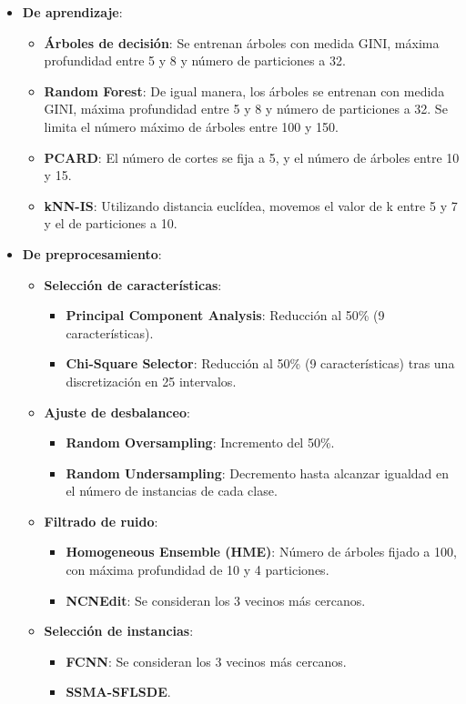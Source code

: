 \begin{itemize}
    \item \textbf{De aprendizaje}: \begin{itemize}
        \item \textbf{Árboles de decisión}: Se entrenan árboles con medida GINI, máxima profundidad entre 5 y 8 y número de particiones a 32.
        \item \textbf{Random Forest}: De igual manera, los árboles se entrenan con medida GINI, máxima profundidad entre 5 y 8 y número de particiones a 32. Se limita el número máximo de árboles entre 100 y 150.
        \item \textbf{PCARD}: El número de cortes se fija a 5, y el número de árboles entre 10 y 15.
        \item \textbf{kNN-IS}: Utilizando distancia euclídea, movemos el valor de k entre 5 y 7 y el de particiones a 10.
    \end{itemize}
    \item \textbf{De preprocesamiento}: \begin{itemize}
        \item \textbf{Selección de características}: \begin{itemize}
            \item \textbf{Principal Component Analysis}: Reducción al 50\% (9 características).
            \item \textbf{Chi-Square Selector}: Reducción al 50\% (9 características) tras una discretización en 25 intervalos.
        \end{itemize}
        \item \textbf{Ajuste de desbalanceo}: \begin{itemize}
            \item \textbf{Random Oversampling}: Incremento del 50\%.
            \item \textbf{Random Undersampling}: Decremento hasta alcanzar igualdad en el número de instancias de cada clase.
        \end{itemize}
        \item \textbf{Filtrado de ruido}: \begin{itemize}
            \item \textbf{Homogeneous Ensemble (HME)}: Número de árboles fijado a 100, con máxima profundidad de 10 y 4 particiones.
            \item \textbf{NCNEdit}: Se consideran los 3 vecinos más cercanos.
        \end{itemize}
        \item \textbf{Selección de instancias}: \begin{itemize}
            \item \textbf{FCNN}: Se consideran los 3 vecinos más cercanos.
            \item \textbf{SSMA-SFLSDE}.
        \end{itemize}
    \end{itemize}
\end{itemize}
